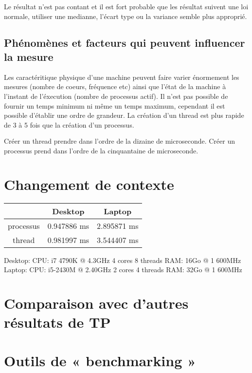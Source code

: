 \documentclass[12pt]{article}
\begin{document}
		Le résultat n'est pas contant et il est fort probable que les résultat suivent
		une loi normale, utiliser une medianne, l'écart type ou la variance semble plus approprié.
		\newline

	\subsection{Phénomènes et facteurs qui peuvent influencer la mesure}

		Les caractéritique physique d'une machine peuvent faire varier énormement les
		mesures (nombre de coeurs, fréquence etc) ainsi que l'état de la machine à
		l'instant de l'éxecution (nombre de processus actif).
		Il n'est pas possible de fournir un temps minimum ni même un temps maximum,
		cependant il est possible d'établir une ordre de grandeur.
		La création d'un thread est plus rapide de 3 à 5 fois que la création d'un
		processus.\newline

		Créer un thread prendre dans l'ordre de la dizaine de microseconde. \newline
		Créer un processus prend dans l'ordre de la cinquantaine de microseconde.\newline

\section{Changement de contexte}

\begin{center}
	\begin{tabular}{ | c | c | c | }
		\hline
			&	Desktop      &    Laptop \\
		\hline
			processus & 0.947886 ms &  2.895871 ms \\
		\hline
			thread    & 0.981997 ms &  3.544407 ms \\
		\hline
	\end{tabular}
\end{center}

Desktop: CPU: i7 4790K @ 4.3GHz 4 cores 8 threads RAM: 16Go @ 1 600MHz
Laptop: CPU: i5-2430M @ 2.40GHz 2 cores 4 threads RAM: 32Go @ 1 600MHz

\section{Comparaison avec d'autres résultats de TP}

\section{Outils de « benchmarking »}
\end{document}
